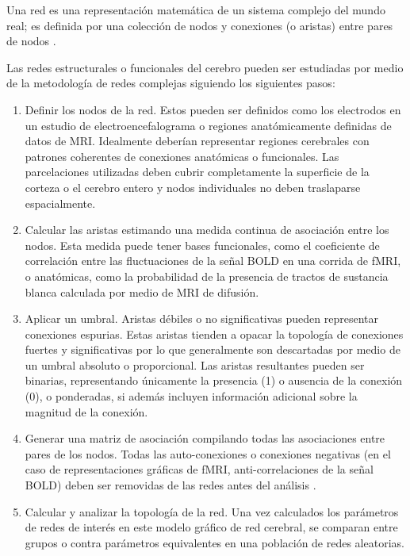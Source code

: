 Una red es una representación matemática de un sistema complejo del mundo real; es definida por una colección de nodos y conexiones (o aristas) entre pares de nodos \parencite{Bullmore2009a,Rubinov2010}. \par
Las redes estructurales o funcionales del cerebro pueden ser estudiadas por medio de la metodología de redes complejas siguiendo los siguientes pasos:
\begin{enumerate}
    \item Definir los nodos de la red.
        Estos pueden ser definidos como los electrodos en un estudio de electroencefalograma o regiones anatómicamente definidas de datos de MRI.
        Idealmente deberían representar regiones cerebrales con patrones coherentes de conexiones anatómicas o funcionales.
        Las parcelaciones utilizadas deben cubrir completamente la superficie de la corteza o el cerebro entero y nodos individuales no deben traslaparse espacialmente.
    \item Calcular las aristas estimando una medida continua de asociación entre los nodos.
        Esta medida puede tener bases funcionales, como el coeficiente de correlación entre las fluctuaciones de la señal BOLD en una corrida de fMRI, o anatómicas, como la probabilidad de la presencia de tractos de sustancia blanca calculada por medio de MRI de difusión.
    \item Aplicar un umbral.
        Aristas débiles o no significativas pueden representar conexiones espurias.
        Estas aristas tienden a opacar la topología de conexiones fuertes y significativas por lo que generalmente son descartadas por medio de un umbral absoluto o proporcional.
        Las aristas resultantes pueden ser binarias, representando únicamente la presencia (1) o ausencia de la conexión (0), o ponderadas, si además incluyen información adicional sobre la magnitud de la conexión.
    \item Generar una matriz de asociación compilando todas las asociaciones entre pares de los nodos.
        Todas las auto-conexiones o conexiones negativas (en el caso de representaciones gráficas de fMRI, anti-correlaciones de la señal BOLD) deben ser removidas de las redes antes del análisis \parencite{Rubinov2010}.
    \item Calcular y analizar la topología de la red.
        Una vez calculados los parámetros de redes de interés en este modelo gráfico de red cerebral, se comparan entre grupos o contra parámetros equivalentes en una población de redes aleatorias.
\end{enumerate}

